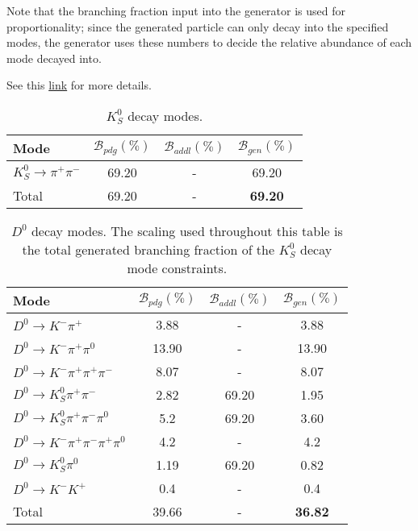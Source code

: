 \documentclass{article}
\renewcommand{\(}{\left(}
\renewcommand{\)}{\right)}
\numberwithin{equation}{section}
\begin{document}
Note that the branching fraction input into the generator is used for proportionality; since the generated particle can only decay into the specified modes, the generator uses these numbers to decide the relative abundance of each mode decayed into.

See this \href{http://www.slac.stanford.edu/~manoni/BtoDtn/signalMC_update.pdf}{link} for more details.

\begin{table}[H]
  \begin{center}
    \begin{tabular}{ l c c c }
      Mode & $\mathcal{B}_{pdg}(\%)$ & $\mathcal{B}_{addl}(\%)$ & $\mathcal{B}_{gen}(\%)$ \\
      \hline\hline
      $K^0_S\rightarrow\pi^+\pi^-$ & 69.20 & - & 69.20 \\
      \hline
      Total & 69.20 & - & \textbf{69.20} \\
      \hline
    \end{tabular}
  \end{center}
  \caption{$K^0_S$ decay modes.}
\end{table}

\begin{table}[H]
  \begin{center}
    \begin{tabular}{ l c c c }
      Mode & $\mathcal{B}_{pdg}(\%)$ & $\mathcal{B}_{addl}(\%)$ & $\mathcal{B}_{gen}(\%)$ \\
      \hline\hline
      $D^0\rightarrow K^-\pi^+$ & 3.88 & - & 3.88 \\
      \hline
      $D^0\rightarrow K^-\pi^+\pi^0$ & 13.90 & - & 13.90 \\
      \hline
      $D^0\rightarrow K^-\pi^+\pi^+\pi^-$ & 8.07 & - & 8.07 \\
      \hline
      $D^0\rightarrow K^0_S\pi^+\pi^-$ & 2.82 & 69.20 & 1.95 \\
      \hline
      $D^0\rightarrow K^0_S\pi^+\pi^-\pi^0$ & 5.2 & 69.20 & 3.60 \\
      \hline
      $D^0\rightarrow K^-\pi^+\pi^-\pi^+\pi^0$ & 4.2 & - & 4.2 \\
      \hline
      $D^0\rightarrow K^0_S\pi^0$ & 1.19 & 69.20 & 0.82 \\
      \hline
      $D^0\rightarrow K^-K^+$ & 0.4 & - & 0.4 \\
      \hline
      Total & 39.66 & - & \textbf{36.82} \\
      \hline
    \end{tabular}
  \end{center}
  \caption{$D^0$ decay modes. The scaling used throughout this table is the total generated branching fraction of the $K^0_S$ decay mode constraints.}
\end{table}
\end{document}
